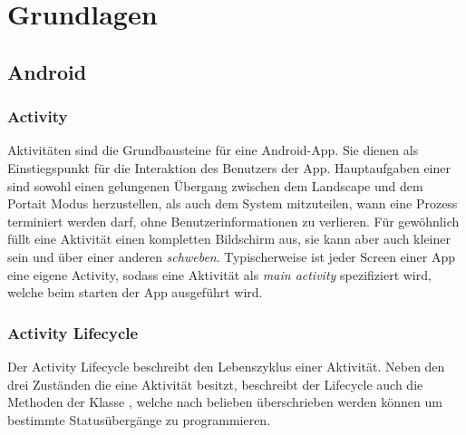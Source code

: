 \chapter{Grundlagen}

\section{Android}
\sectionauthor{\oliver}

\subsection{Activity}
Aktivitäten sind die Grundbausteine für eine Android-App. Sie dienen als 
Einstiegspunkt für die Interaktion des Benutzers der App. Hauptaufgaben einer 
 sind sowohl einen gelungenen Übergang zwischen dem Landscape und 
dem Portait Modus herzustellen, als auch dem System mitzuteilen, wann eine 
Prozess terminiert werden darf, ohne Benutzerinformationen zu verlieren. Für 
gewöhnlich füllt eine Aktivität einen kompletten Bildschirm aus, sie kann aber 
auch kleiner sein und über einer anderen \emph{schweben}. Typischerweise ist 
jeder Screen einer App eine eigene Activity, sodass eine Aktivität als 
\emph{main activity} spezifiziert wird, welche beim starten der App ausgeführt 
wird.

\subsection{Activity Lifecycle}
Der Activity Lifecycle beschreibt den Lebenszyklus einer Aktivität. Neben den 
drei Zuständen die eine Aktivität besitzt, beschreibt der Lifecycle auch die 
Methoden der Klasse , welche nach belieben überschrieben werden 
können um bestimmte Statusübergänge zu programmieren.

